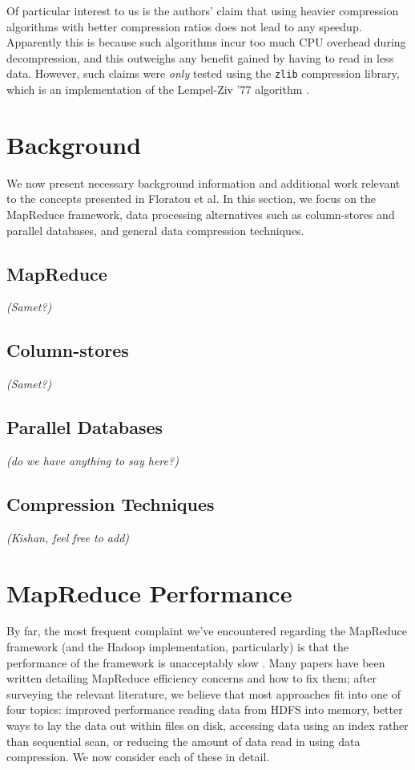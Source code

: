 \documentclass[twocolumn]{article}
\begin{document}
Of particular interest to us is the authors' claim that using heavier compression
algorithms with better compression ratios does not lead to any speedup.  Apparently
this is because such algorithms incur too much CPU overhead during decompression,
and this outweighs any benefit gained by having to read in less data.  However,
such claims were \emph{only} tested using the \verb+zlib+ compression library,
which is an implementation of the Lempel-Ziv '77 algorithm \cite{ref:lz77}.

\section{Background}

We now present necessary background information and additional work
relevant to the concepts presented in Floratou et al.  In this section,
we focus on the MapReduce framework, data processing alternatives such
as column-stores and parallel databases, and general data compression
techniques.

\subsection{MapReduce}

\emph{(Samet?)}

\subsection{Column-stores}

\emph{(Samet?)}

\subsection{Parallel Databases}

\emph{(do we have anything to say here?)}

\subsection{Compression Techniques}

\emph{(Kishan, feel free to add)}

\section{MapReduce Performance}

By far, the most frequent complaint we've encountered regarding the MapReduce
framework (and the Hadoop implementation, particularly) is that the performance
of the framework is unacceptably slow \cite{ref:friends-or-foes}.  Many papers
have been written detailing
MapReduce efficiency concerns and how to fix them; after surveying the relevant literature,
we believe that most approaches fit into one of four topics: improved performance reading
data from HDFS into memory, better ways to lay the data out within files on disk,
accessing data using an index rather than sequential scan, or reducing the
amount of data read in using data compression.  We now consider each
of these in detail.
\end{document}
